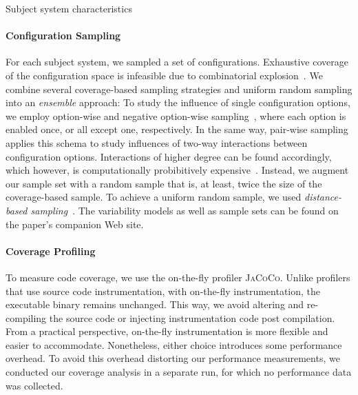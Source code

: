 \begin{table}[ht!]
		\centering
		\caption{Subject system characteristics}
		
		\label{tab:subject_systems}
	\end{table}

\paragraph*{Configuration Sampling}\label{sec:sampling}
For each subject system, we sampled a set of configurations. Exhaustive coverage of the configuration space is infeasible due to combinatorial explosion~\cite{henardCombining2015}. We combine several coverage-based sampling strategies and uniform random sampling into an \emph{ensemble} approach: To study the influence of single configuration options, we employ option-wise and negative option-wise sampling~\cite{siegmundPerformanceinfluenceModelsHighly2015}, where each option is enabled once, or all except one, respectively. In the same way, pair-wise sampling applies this schema to study influences of two-way interactions between configuration options. Interactions of higher degree can be found accordingly, which however, is computationally probibitively expensive~\cite{henardCombining2015}. Instead, we augment our sample set with a random sample that is, at least, twice the size of the coverage-based sample. To achieve a uniform random sample, we used \emph{distance-based sampling}~\cite{kaltenecker_distance-based_2019}. The variability models as well as sample sets can be found on the paper's companion Web site.
	
\paragraph*{Coverage Profiling}\label{sec:profiling}
To measure code coverage, we use the on-the-fly profiler \textsc{JaCoCo}. Unlike profilers that use source code instrumentation, with on-the-fly instrumentation, the executable binary remains unchanged. This way, we avoid altering and re-compiling the source code or injecting instrumentation code post compilation. From a practical perspective, on-the-fly instrumentation is more flexible and easier to accommodate. Nonetheless, either choice introduces some performance overhead. To avoid this overhead distorting our performance measurements, we conducted our coverage analysis in a separate run, for which no performance data was collected. 	
	
